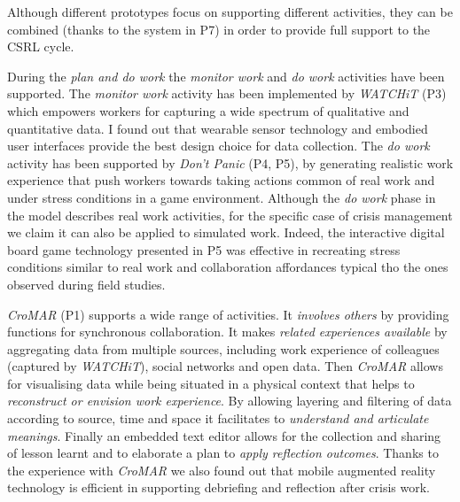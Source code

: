 Although different prototypes focus on supporting different activities, they can be combined (thanks to the system in P7) in order to provide full support to the CSRL cycle. 

During the \emph{plan and do work} the \emph{monitor work} and \emph{do work} activities have been supported. The \emph{monitor work} activity has been implemented by \emph{WATCHiT} (P3) which empowers workers for capturing a wide spectrum of qualitative and quantitative data. I found out that wearable sensor technology and embodied user interfaces provide the best design choice for data collection. The \emph{do work} activity has been supported by \emph{Don't Panic} (P4, P5), by generating realistic work experience that push workers towards taking actions common of real work and under stress conditions in a game environment. Although the \emph{do work} phase in the model describes real work activities, for the specific case of crisis management we claim it can also be applied to simulated work. Indeed, the interactive digital board game technology presented in P5 was effective in recreating stress conditions similar to real work and collaboration affordances typical tho the ones observed during field studies.

\emph{CroMAR} (P1) supports a wide range of activities. It \emph{involves others} by providing functions for synchronous collaboration. It makes \emph{related experiences available} by aggregating data from multiple sources, including work experience of colleagues (captured by \emph{WATCHiT}), social networks and open data. Then \emph{CroMAR} allows for visualising data while being situated in a physical context that helps to \emph{reconstruct or envision work experience}. By allowing layering and filtering of data according to source, time and space it facilitates to \emph{understand and articulate meanings}. Finally an embedded text editor allows for the collection and sharing of lesson learnt and to elaborate a plan to \emph{apply reflection outcomes}. Thanks to the experience with \emph{CroMAR} we also found out that mobile augmented reality technology is efficient in supporting debriefing and reflection after crisis work.

